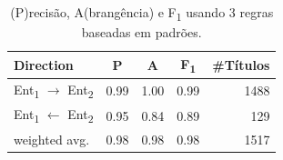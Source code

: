 \documentclass[a4paper, twocolumn, 11pt, twoside]{article}
\begin{document}
\begin{table}[!h]
    \begin{center}
    \begin{tabular}{l cccr}
        {\bf Direction} & {\bf P} & {\bf A} & {\bf F\textsubscript{1}} & {\bf \#Títulos} \\
        \hline
        \small{Ent\textsubscript{1} $\rightarrow$ Ent\textsubscript{2}} & 0.99  &  1.00  &  0.99  & 1488 \\
		\small{Ent\textsubscript{1} $\leftarrow$ Ent\textsubscript{2}}  & 0.95  &  0.84  &  0.89  & 129  \\
		\hline
	    weighted avg.     &      0.98       & 0.98       & 0.98		&   1517 \\
    \end{tabular}
	\caption{(P)recisão, A(brangência) e F\textsubscript{1} usando 3 regras baseadas em padrões.}
	\label{tab:direction_clf_results}
	\end{center}
\end{table}
\end{document}
